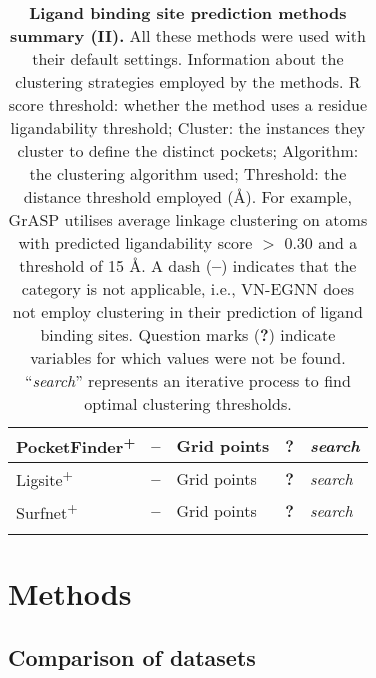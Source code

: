 \begin{landscape}
\begin{longtable}{|M{35mm}|M{45mm}|M{35mm}|M{35mm}|M{35mm}|}
PocketFinder\textsuperscript{+} & \textbf{--}                 & Grid points            & \textbf{?}         & \textit{search}         \\ \hline
Ligsite\textsuperscript{+}      & \textbf{--}                 & Grid points            & \textbf{?}         & \textit{search} \\ \hline
Surfnet\textsuperscript{+}      & \textbf{--}                 & Grid points            & \textbf{?}         & \textit{search}      \\ \hline
\caption[Ligand binding site prediction methods summary (II)]{\textbf{Ligand binding site prediction methods summary (II).} All these methods were used with their default settings. Information about the clustering strategies employed by the methods. R score threshold: whether the method uses a residue ligandability threshold; Cluster: the instances they cluster to define the distinct pockets; Algorithm: the clustering algorithm used; Threshold: the distance threshold employed (\AA{}). For example, GrASP utilises average linkage clustering on atoms with predicted ligandability score $>$ 0.30 and a threshold of 15 \AA{}. A dash (\textbf{--}) indicates that the category is not applicable, i.e., VN-EGNN does not employ clustering in their prediction of ligand binding sites. Question marks (\textbf{?}) indicate variables for which values were not be found. ``\textit{search}'' represents an iterative process to find optimal clustering thresholds.}
\label{tab:methods_details_2}\\
\end{longtable}
\end{landscape}

\section{Methods}

\subsection{Comparison of datasets}

